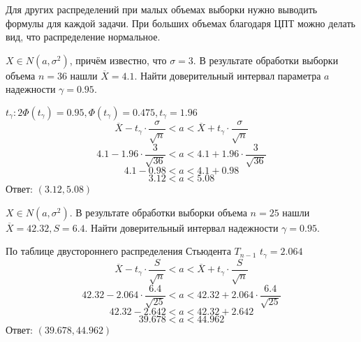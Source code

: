 Для других распределений при малых объемах выборки нужно выводить формулы для каждой задачи. При больших объемах благодаря ЦПТ можно делать вид, что распределение нормальное.

\begin{example}
    \(X \in N(a, \sigma^2)\), причём известно, что \(\sigma = 3\). В результате обработки выборки объема \(n = 36\) нашли \(\overline{X} = 4.1\). Найти доверительный интервал параметра \(a\) надежности \(\gamma = 0.95\).
\end{example}
\begin{solution}
    \(t_\gamma : 2 \Phi(t_\gamma) = 0.95, \Phi(t_\gamma) = 0.475, t_\gamma = 1.96\)
    \[\overline{X} - t_\gamma \cdot \frac{\sigma}{\sqrt{n}} < a < \overline{X} + t_\gamma \cdot \frac{\sigma}{\sqrt{n}}\]
    \[4.1 - 1.96 \cdot \frac{3}{\sqrt{36}} < a < 4.1 + 1.96 \cdot \frac{3}{\sqrt{36}}\]
    \[4.1 - 0.98 < a < 4.1 + 0.98\]
    \[3.12 < a < 5.08\]
    Ответ: \((3.12, 5.08)\)
\end{solution}

\begin{example}
    \(X \in N(a, \sigma^2)\). В результате обработки выборки объема \(n = 25\) нашли \(\overline{X} = 42.32, S = 6.4\). Найти доверительный интервал надежности \(\gamma = 0.95\).
\end{example}
\begin{solution}
    По таблице двустороннего распределения Стьюдента \(T_{n-1}\) \(t_\gamma = 2.064\)
    \[\overline{X} - t_\gamma \cdot \frac{S}{\sqrt{n}} < a < \overline{X} + t_\gamma \cdot \frac{S}{\sqrt{n}}\]
    \[42.32 - 2.064 \cdot \frac{6.4}{\sqrt{25}} < a < 42.32 + 2.064 \cdot \frac{6.4}{\sqrt{25}}\]
    \[42.32 - 2.642 < a < 42.32 + 2.642\]
    \[39.678 < a < 44.962\]
    Ответ: \((39.678, 44.962)\)
\end{solution}
